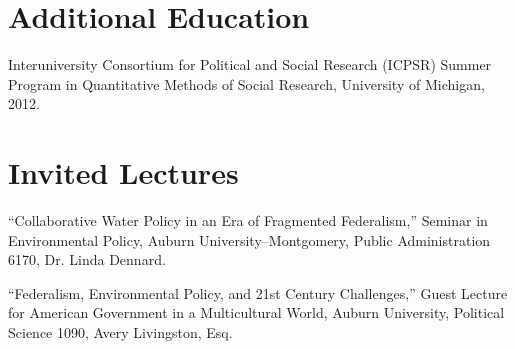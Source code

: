\documentclass[11pt,letterpaper]{article}
\renewenvironment{itemize}{
  \begin{list}{}{
    \setlength{\leftmargin}{1.5em}
    \setlength{\itemsep}{0.25em}
    \setlength{\parskip}{0pt}
    \setlength{\parsep}{0.25em}
  }
}{
  \end{list}
}
\begin{document}
\section*{Additional Education}
\begin{itemize}
\item Interuniversity Consortium for Political and Social Research (ICPSR) Summer Program in Quantitative Methods of Social Research, University of Michigan, 2012. 
\end{itemize}

\section*{Invited Lectures}
\begin{itemize}\leftmargin=2pt\itemindent=-15pt
	\item ``Collaborative Water Policy in an Era of Fragmented Federalism,'' Seminar in Environmental Policy, Auburn University--Montgomery, Public Administration 6170, Dr. Linda Dennard.
	
	\item ``Federalism, Environmental Policy, and 21st Century Challenges,'' Guest Lecture for American Government in a Multicultural World, Auburn University, Political Science 1090, Avery Livingston, Esq. 
	
\end{itemize}
\end{document}
